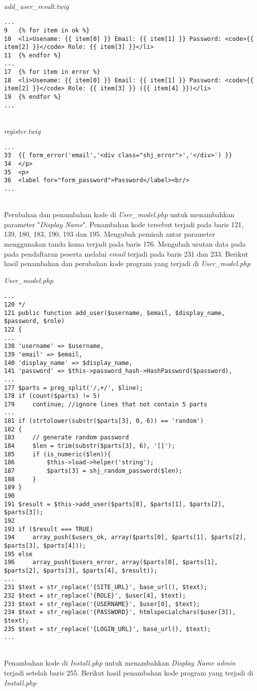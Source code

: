 ~\\
\textit{add\_user\_result.twig}
\begin{lstlisting}[basicstyle=\ttfamily, frame=single,
columns=fullflexible, keepspaces=true, breaklines=true]
...
9	{% for item in ok %}
10	<li>Usename: {{ item[0] }} Email: {{ item[1] }} Password: <code>{{ item[2] }}</code> Role: {{ item[3] }}</li>
11	{% endfor %}
...
17	{% for item in error %}
18	<li>Usename: {{ item[0] }} Email: {{ item[1] }} Password: <code>{{ item[2] }}</code> Role: {{ item[3] }} ({{ item[4] }})</li>
19	{% endfor %}
...
\end{lstlisting}
~\\
\textit{register.twig}
\begin{lstlisting}[basicstyle=\ttfamily, frame=single,
columns=fullflexible, keepspaces=true, breaklines=true]
...
33	{{ form_error('email','<div class="shj_error">','</div>') }}
34	</p>
35	<p>
36	<label for="form_password">Password</label><br/>
...
\end{lstlisting}
~\\
Perubahan dan penambahan kode di \textit{User\_model.php} untuk menambahkan parameter "\textit{Display Name}". Penambahan kode tersebut terjadi pada baris 121, 139, 180, 183, 190, 193 dan 195. Mengubah pemisah antar parameter menggunakan tanda koma terjadi pada baris 176. Mengubah urutan data pada pada pendaftaran peserta melalui \textit{email} terjadi pada baris 231 dan 233. Berikut hasil penambahan dan perubahan kode program yang terjadi di \textit{User\_model.php}

\textit{User\_model.php}
\begin{lstlisting}[basicstyle=\ttfamily, frame=single,
columns=fullflexible, keepspaces=true, breaklines=true]
...
120	*/
121	public function add_user($username, $email, $display_name, $password, $role)
122	{
...
138	'username' => $username,
139	'email' => $email,
140	'display_name' => $display_name,
141	'password' => $this->password_hash->HashPassword($password),
...
177	$parts = preg_split('/,+/', $line);
178	if (count($parts) != 5)
179		continue; //ignore lines that not contain 5 parts
...
181	if (strtolower(substr($parts[3], 0, 6)) == 'random')
182	{
183		// generate random password
184		$len = trim(substr($parts[3], 6), '[]');
185		if (is_numeric($len)){
186			$this->load->helper('string');
187			$parts[3] = shj_random_password($len);
188		}
189	}
190	
191	$result = $this->add_user($parts[0], $parts[1], $parts[2], $parts[3]);
192	
193	if ($result === TRUE)
194		array_push($users_ok, array($parts[0], $parts[1], $parts[2], $parts[3], $parts[4]));
195	else
196		array_push($users_error, array($parts[0], $parts[1], $parts[2], $parts[3], $parts[4], $result));
...
231	$text = str_replace('{SITE_URL}', base_url(), $text);
232	$text = str_replace('{ROLE}', $user[4], $text);
233	$text = str_replace('{USERNAME}', $user[0], $text);
234	$text = str_replace('{PASSWORD}', htmlspecialchars($user[3]), $text);
235	$text = str_replace('{LOGIN_URL}', base_url(), $text);
...
\end{lstlisting}
~\\
Penambahan kode di \textit{Install.php} untuk menambahkan \textit{Display Name admin} terjadi setelah baris 255. Berikut hasil penambahan kode program yang terjadi di \textit{Install.php}
 
